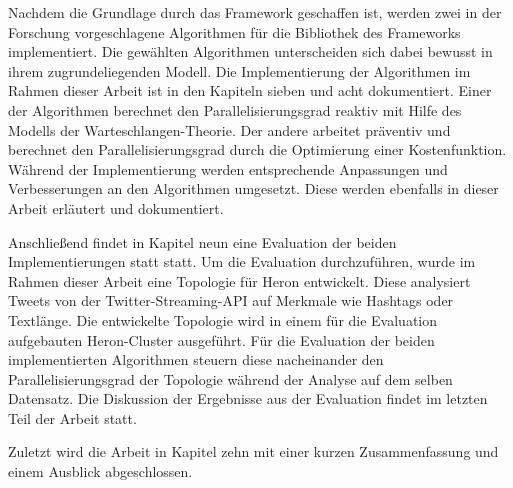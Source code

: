 Nachdem die Grundlage durch das Framework geschaffen ist, werden zwei in der Forschung vorgeschlagene Algorithmen für die Bibliothek des Frameworks implementiert.
Die gewählten Algorithmen unterscheiden sich dabei bewusst in ihrem zugrundeliegenden Modell.
Die Implementierung der Algorithmen im Rahmen dieser Arbeit ist in den Kapiteln sieben und acht dokumentiert.
Einer der Algorithmen berechnet den Parallelisierungsgrad reaktiv mit Hilfe des Modells der Warteschlangen-Theorie.
Der andere arbeitet präventiv und berechnet den Parallelisierungsgrad durch die Optimierung einer Kostenfunktion.
Während der Implementierung werden entsprechende Anpassungen und Verbesserungen an den Algorithmen umgesetzt.
Diese werden ebenfalls in dieser Arbeit erläutert und dokumentiert.

Anschließend findet in Kapitel neun eine Evaluation der beiden Implementierungen statt statt.
Um die Evaluation durchzuführen, wurde im Rahmen dieser Arbeit eine Topologie für Heron entwickelt.
Diese analysiert Tweets von der Twitter-Streaming-API auf Merkmale wie Hashtags oder Textlänge.
Die entwickelte Topologie wird in einem für die Evaluation aufgebauten Heron-Cluster ausgeführt.
Für die Evaluation der beiden implementierten Algorithmen steuern diese nacheinander den Parallelisierungsgrad der Topologie während der Analyse auf dem selben Datensatz.
Die Diskussion der Ergebnisse aus der Evaluation findet im letzten Teil der Arbeit statt.

Zuletzt wird die Arbeit in Kapitel zehn mit einer kurzen Zusammenfassung und einem Ausblick abgeschlossen. 